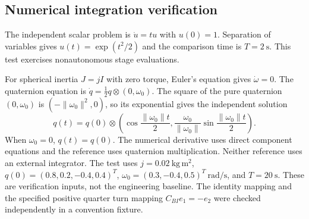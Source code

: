 \subsection{Numerical integration verification}
The independent scalar problem is $\dot u=tu$ with $u(0)=1$.
Separation of variables gives $u(t)=\exp(t^2/2)$ and the comparison time is
$T=2\ \mathrm{s}$. This test exercises nonautonomous stage evaluations.

For spherical inertia $J=jI$ with zero torque, Euler's equation gives
$\dot\omega=0$. The quaternion equation is
$\dot q=\tfrac12 q\otimes(0,\omega_0)$.
The square of the pure quaternion $(0,\omega_0)$ is
$(-\|\omega_0\|^2,0)$, so its exponential gives the independent solution
\[
q(t)=q(0)\otimes
\left(\cos\frac{\|\omega_0\|t}{2},
\frac{\omega_0}{\|\omega_0\|}\sin\frac{\|\omega_0\|t}{2}\right).
\]
When $\omega_0=0$, $q(t)=q(0)$. The numerical derivative uses direct component
equations and the reference uses quaternion multiplication. Neither reference
uses an external integrator. The test uses $j=0.02\ \mathrm{kg\,m^2}$,
$q(0)=(0.8,0.2,-0.4,0.4)^T$,
$\omega_0=(0.3,-0.4,0.5)^T\ \mathrm{rad/s}$, and $T=20\ \mathrm{s}$.
These are verification inputs, not the engineering baseline.
The identity mapping and the specified positive quarter turn mapping
$C_{BI}e_1=-e_2$ were checked independently in a convention fixture.

